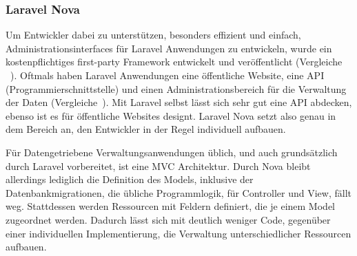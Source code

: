 \subsubsection{Laravel Nova}
Um Entwickler dabei zu unterstützen, besonders effizient und einfach, Administrationsinterfaces für Laravel Anwendungen zu entwickeln, wurde ein kostenpflichtiges first-party Framework entwickelt und veröffentlicht (Vergleiche ~\cite{laravel-nova}).
Oftmals haben Laravel Anwendungen eine öffentliche Website, eine API (Programmierschnittstelle) und einen Administrationsbereich für die Verwaltung der Daten (Vergleiche~\cite{laravel-up-and-running}).
Mit Laravel selbst lässt sich sehr gut eine API abdecken, ebenso ist es für öffentliche Websites designt.
Laravel Nova setzt also genau in dem Bereich an, den Entwickler in der Regel individuell aufbauen.

Für Datengetriebene Verwaltungsanwendungen üblich, und auch grundsätzlich durch Laravel vorbereitet, ist eine MVC Architektur.
Durch Nova bleibt allerdings lediglich die Definition des Models, inklusive der Datenbankmigrationen, die übliche Programmlogik, für Controller und View, fällt weg.
Stattdessen werden Ressourcen mit Feldern definiert, die je einem Model zugeordnet werden.
Dadurch lässt sich mit deutlich weniger Code, gegenüber einer individuellen Implementierung, die Verwaltung unterschiedlicher Ressourcen aufbauen.
